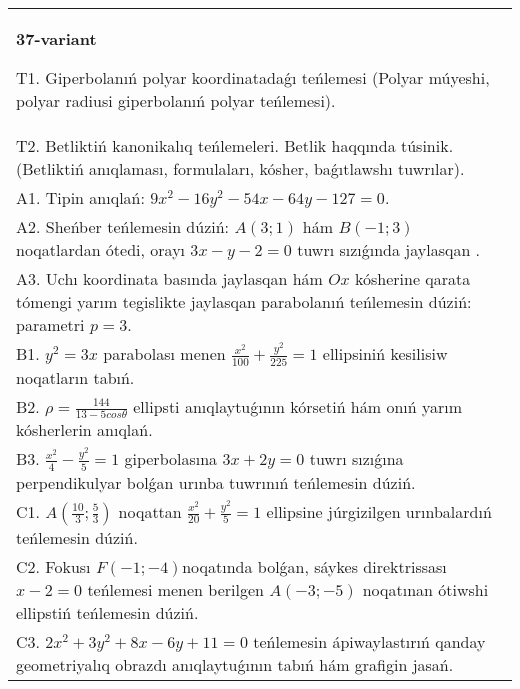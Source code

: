 \documentclass{article}
\begin{document}
\begin{tabular}{m{17cm}}
\textbf{37-variant}
\newline

T1. Giperbolanıń polyar koordinatadaǵı teńlemesi (Polyar múyeshi, polyar radiusi giperbolanıń polyar teńlemesi).\\

T2. Betliktiń kanonikalıq teńlemeleri. Betlik haqqında túsinik. (Betliktiń anıqlaması, formulaları, kósher, baǵıtlawshı tuwrılar).\\

A1. Tipin anıqlań: $9 x^{2}-16 y^{2}-54 x-64 y-127=0$.\\

A2. Sheńber teńlemesin dúziń: $A (3;1) $ hám $B (-1;3) $ noqatlardan ótedi, orayı $3 x-y-2=0$ tuwrı sızıǵında jaylasqan .\\

A3. Uchı koordinata basında jaylasqan hám $Ox$ kósherine qarata tómengi yarım tegislikte jaylasqan parabolanıń teńlemesin dúziń: parametri $p=3$.\\

B1. $y^{2} = 3x$ parabolası menen $\frac{x^{2}}{100} + \frac{y^{2}}{225} = 1$ ellipsiniń kesilisiw noqatların tabıń.  \\

B2. $\rho = \frac{144}{13 - 5cos\theta}$ ellipsti anıqlaytuǵının kórsetiń hám onıń yarım kósherlerin anıqlań.\\

B3. $\frac{x^{2}}{4} - \frac{y^{2}}{5} = 1$ giperbolasına $3x + 2y = 0$ tuwrı sızıǵına perpendikulyar bolǵan urınba tuwrınıń teńlemesin dúziń.\\

C1. $A(\frac{10}{3};\frac{5}{3})$ noqattan $\frac{x^{2}}{20} + \frac{y^{2}}{5} = 1$ ellipsine júrgizilgen urınbalardıń teńlemesin dúziń.  \\

C2. Fokusı $F( - 1; - 4)$noqatında bolǵan, sáykes direktrissası $x - 2 = 0$ teńlemesi menen berilgen $A( - 3; - 5)$ noqatınan ótiwshi ellipstiń teńlemesin dúziń.  \\

C3. $2x^{2} + 3y^{2} + 8x - 6y + 11 = 0$ teńlemesin ápiwaylastırıń qanday geometriyalıq obrazdı anıqlaytuǵının tabıń hám grafigin jasań.  \\

\end{tabular}
\vspace{1cm}
\end{document}
